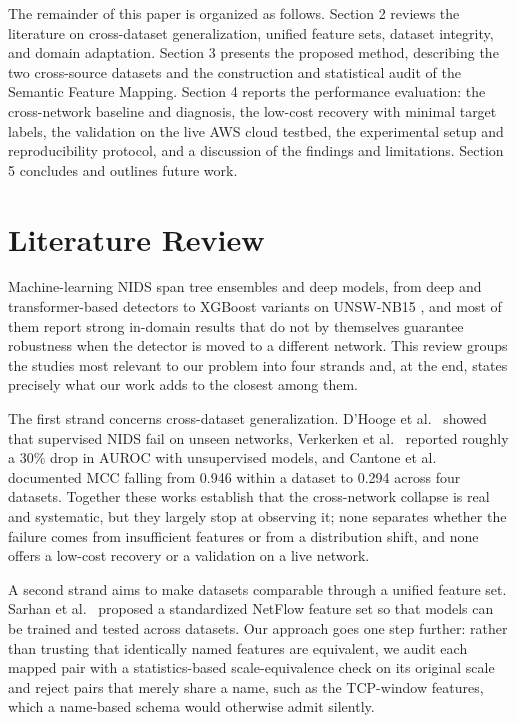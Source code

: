 \documentclass[11pt,a4paper]{article}
\begin{document}
The remainder of this paper is organized as follows. Section 2 reviews the literature on
cross-dataset generalization, unified feature sets, dataset integrity, and domain
adaptation. Section 3 presents the proposed method, describing the two cross-source
datasets and the construction and statistical audit of the Semantic Feature Mapping.
Section 4 reports the performance evaluation: the cross-network baseline and diagnosis,
the low-cost recovery with minimal target labels, the validation on the live AWS cloud
testbed, the experimental setup and reproducibility protocol, and a discussion of the
findings and limitations. Section 5 concludes and outlines future work.

\section{Literature Review}
Machine-learning NIDS span tree ensembles and deep models, from deep and
transformer-based detectors \cite{shone,wu} to XGBoost variants on UNSW-NB15
\cite{husain}, and most of them report strong in-domain results that do not by
themselves guarantee robustness when the detector is moved to a different network.
This review groups the studies most relevant to our problem into four strands and, at
the end, states precisely what our work adds to the closest among them.

The first strand concerns cross-dataset generalization. D'Hooge et al.\ \cite{dhooge}
showed that supervised NIDS fail on unseen networks, Verkerken et al.\ \cite{verkerken}
reported roughly a 30\% drop in AUROC with unsupervised models, and Cantone et al.\
\cite{cantone} documented MCC falling from 0.946 within a dataset to 0.294 across four
datasets. Together these works establish that the cross-network collapse is real and
systematic, but they largely stop at observing it; none separates whether the failure
comes from insufficient features or from a distribution shift, and none offers a
low-cost recovery or a validation on a live network.

A second strand aims to make datasets comparable through a unified feature set. Sarhan
et al.\ \cite{sarhan,sarhannf} proposed a standardized NetFlow feature set so that
models can be trained and tested across datasets. Our approach goes one step further:
rather than trusting that identically named features are equivalent, we audit each
mapped pair with a statistics-based scale-equivalence check on its original scale and
reject pairs that merely share a name, such as the TCP-window features, which a
name-based schema would otherwise admit silently.
\end{document}

